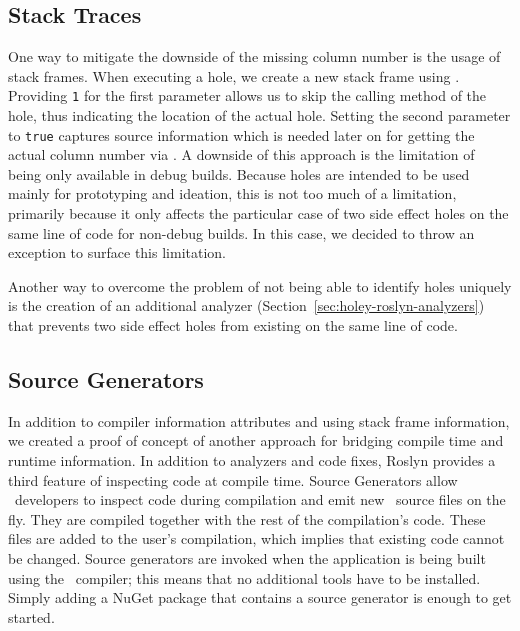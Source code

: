 \subsection{Stack Traces}
\label{sec:holey-stack-traces}
One way to mitigate the downside of the missing column number is the usage of stack frames.
When executing a hole, we create a new stack frame using \texttt{}.
Providing \verb|1| for the first parameter allows us to skip the calling method of the hole, thus indicating the location of the actual hole.
Setting the second parameter to \verb|true| captures source information which is needed later on for getting the actual column number via \texttt{}.
A downside of this approach is the limitation of being only available in debug builds.
Because holes are intended to be used mainly for prototyping and ideation, this is not too much of a limitation, primarily because it only affects the particular case of two side effect holes on the same line of code for non-debug builds.
In this case, we decided to throw an exception to surface this limitation.

Another way to overcome the problem of not being able to identify holes uniquely is the creation of an additional analyzer (Section~\ref{sec:holey-roslyn-analyzers}) that prevents two side effect holes from existing on the same line of code.


\subsection{Source Generators}
\label{sec:source-generators}
In addition to compiler information attributes and using stack frame information, we created a proof of concept of another approach for bridging compile time and runtime information.
In addition to analyzers and code fixes, Roslyn provides a third feature of inspecting code at compile time.
Source Generators \cite{microsoft_source_2023} allow \CS\ developers to inspect code during compilation and emit new \CS\ source files on the fly.
They are compiled together with the rest of the compilation's code.
These files are added to the user's compilation, which implies that existing code cannot be changed.
Source generators are invoked when the application is being built using the \CS\ compiler; this means that no additional tools have to be installed.
Simply adding a NuGet package that contains a source generator is enough to get started. 

